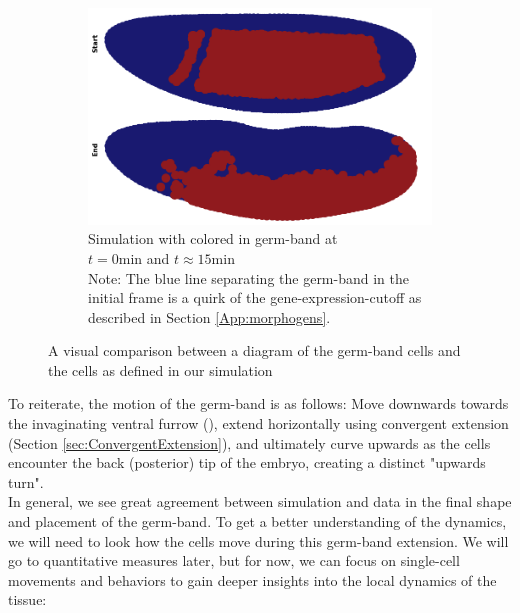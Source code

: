 \begin{figure}[H]
\begin{subfigure}[b]{0.3\textwidth}
    \end{subfigure}
    \begin{subfigure}[b]{0.61\textwidth}
    \includegraphics[width=\textwidth]{chapters/Results/figures/gb_firstframe_lastframe.png}
    \caption{Simulation with colored in germ-band at\\ $t = 0 \text{min}$ and $t \approx 15 \text{min}$\\Note: The blue line separating the germ-band in the initial frame is a quirk of the gene-expression-cutoff as described in Section \ref{App:morphogens}.}
    \end{subfigure}
    \caption{A visual comparison between a diagram of the germ-band cells and the cells as defined in our simulation\\}
    \label{fig:germbandCompare}
\end{figure}



To reiterate, the motion of the germ-band is as follows: Move downwards towards the invaginating ventral furrow (), extend horizontally using convergent extension (Section \ref{sec:ConvergentExtension}), and ultimately curve upwards as the cells encounter the back (posterior) tip of the embryo, creating a distinct "upwards turn".\\

In general, we see great agreement between simulation and data in the final shape and placement of the germ-band. To get a better understanding of the dynamics, we will need to look how the cells move during this germ-band extension.
We will go to quantitative measures later, but for now, we can focus on single-cell movements and behaviors to gain deeper insights into the local dynamics of the tissue:\\

